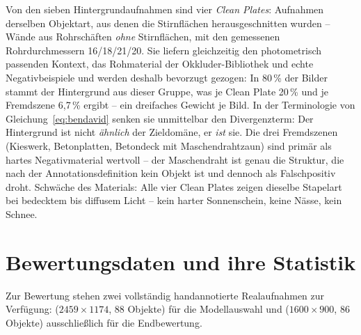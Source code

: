  Von den sieben Hintergrundaufnahmen sind vier
\emph{Clean Plates}: Aufnahmen derselben Objektart, aus denen die Stirnflächen
herausgeschnitten wurden -- Wände aus Rohrschäften \emph{ohne} Stirnflächen, mit
den gemessenen Rohrdurchmessern 16/18/21/20\px{}. Sie liefern gleichzeitig den
photometrisch passenden Kontext, das Rohmaterial der Okkluder-Bibliothek und
echte Negativbeispiele und werden deshalb bevorzugt gezogen: In 80\,\% der
Bilder stammt der Hintergrund aus dieser Gruppe, was je Clean Plate 20\,\% und
je Fremdszene 6,7\,\% ergibt -- ein dreifaches Gewicht je Bild. In der
Terminologie von Gleichung~\eqref{eq:bendavid} senken sie unmittelbar den
Divergenzterm: Der Hintergrund ist nicht \emph{ähnlich} der Zieldomäne, er
\emph{ist} sie. Die drei Fremdszenen (Kieswerk, Betonplatten, Betondeck mit
Maschendrahtzaun) sind primär als hartes Negativmaterial wertvoll -- der
Maschendraht ist genau die Struktur, die nach der Annotationsdefinition kein
Objekt ist und dennoch als Falschpositiv droht. Schwäche des Materials: Alle vier
Clean Plates zeigen dieselbe Stapelart bei bedecktem bis diffusem Licht -- kein
harter Sonnenschein, keine Nässe, kein Schnee.

\section{Bewertungsdaten und ihre Statistik}
\label{sec:valtest}

Zur Bewertung stehen zwei vollständig handannotierte Realaufnahmen zur
Verfügung:  ($2459\times1174$, 88 Objekte) für die Modellauswahl und
 ($1600\times900$, 86 Objekte) ausschließlich für die Endbewertung.

